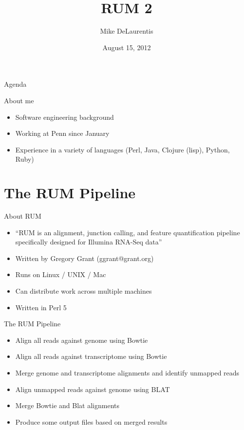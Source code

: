 \documentclass{beamer}
\title[RUM 2]{RUM 2}
\author{Mike DeLaurentis}
\institute{University of Pennsylvania}
\date{August 15, 2012}
\begin{document}
\begin{frame}
\titlepage
\end{frame}

\begin{frame}{Agenda}
  \tableofcontents
\end{frame}

\begin{frame}{About me}
  \begin{itemize}
  \item Software engineering background
  \item Working at Penn since January
  \item Experience in a variety of languages (Perl, Java, Clojure (lisp), Python, Ruby)
  \end{itemize}
\end{frame}

\section{The RUM Pipeline}

\begin{frame}{About RUM}
  \begin{itemize}
  \item ``RUM is an alignment, junction calling, and feature quantification pipeline specifically designed for Illumina RNA-Seq data''
  \item Written by Gregory Grant (ggrant@grant.org)
  \item Runs on Linux / UNIX / Mac
  \item Can distribute work across multiple machines
  \item Written in Perl 5
  \end{itemize}
\end{frame}

\begin{frame}{The RUM Pipeline}
\begin{itemize}
  \item Align all reads against genome using Bowtie
  \item Align all reads against transcriptome using Bowtie
  \item Merge genome and transcriptome alignments and identify unmapped reads
  \item Align unmapped reads against genome using BLAT
  \item Merge Bowtie and Blat alignments
  \item Produce some output files based on merged results
\end{itemize}
\end{frame}
\end{document}
